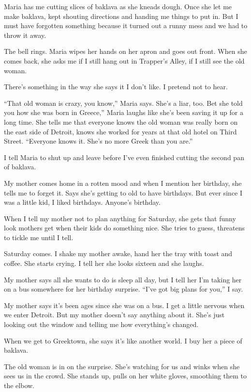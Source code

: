 \documentclass[
]{article}
\begin{document}
Maria has me cutting slices of baklava as she kneads dough. Once she let
me make baklava, kept shouting directions and handing me things to put
in. But I must have forgotten something because it turned out a runny
mess and we had to throw it away.

The bell rings. Maria wipes her hands on her apron and goes out front.
When she comes back, she asks me if I still hang out in Trapper's Alley,
if I still see the old woman.

There's something in the way she says it I don't like. I pretend not to
hear.

``That old woman is crazy, you know,'' Maria says. She's a liar, too.
Bet she told you how she was born in Greece,'' Maria laughs like she's
been saving it up for a long time. She tells me that every­one knows the
old woman was really born on the east side of Detroit, knows she worked
for years at that old hotel on Third Street. ``Everyone knows it. She's
no more Greek than you are.''

I tell Maria to shut up and leave before I've even finished cutting the
second pan of baklava.

My mother comes home in a rotten mood and when I mention her birthday,
she tells me to forget it. Says she's getting to old to have birthdays.
But ever since I was a little kid, I liked birthdays. Anyone's birthday.

When I tell my mother not to plan anything for Saturday, she gets that
funny look mothers get when their kids do something nice. She tries to
guess, threatens to tickle me until I tell.

Saturday comes. I shake my mother awake, hand her the tray with toast
and coffee. She starts crying. I tell her she looks sixteen and she
laughs.

My mother says all she wants to do is sleep all day, but I tell her I'm
taking her on a bus some­where for her birthday surprise. ``I've got big
plans for you,'' I say.

My mother says it's been ages since she was on a bus. I get a little
nervous when we enter Detroit. But my mother doesn't say anything about
it. She's just looking out the window and telling me how everything's
changed.

When we get to Greektown, she says it's like another world. I buy her a
piece of baklava.

The old woman is in on the surprise. She's watching for us and winks
when she sees us in the crowd. She stands up, pulls on her white gloves,
smoothing them to the elbow.
\end{document}
